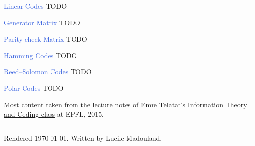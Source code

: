 \documentclass[10pt,a4paper,landscape]{article}
\newcommand{\concept}[1]{\textcolor{RoyalBlue}{#1}}
\renewcommand{\section}[1]{
    \vspace{-0.3cm}
    \begin{center}
      \color{Bittersweet}
      \hrulefill{\small~~#1~~}\hrulefill
    \end{center}
    \vspace{-0.3cm}
  }
\begin{document}
\begin{multicols*}{4}
\concept{Linear Codes} TODO
 
\concept{Generator Matrix} TODO
 
\concept{Parity-check Matrix} TODO
 
\concept{Hamming Codes} TODO

\concept{Reed–Solomon Codes} TODO

\concept{Polar Codes} TODO

\ifdefined \longversion %
\else \newpage
\fi



\section{Credits}
Most content taken from the lecture notes of Emre Telatar's \href{http://ipg.epfl.ch/doku.php?id=en:courses:2015-2016:itc}{Information Theory and Coding class} at EPFL, 2015.

\vspace{0.5cm}
\hrule
\vspace{0.5cm}
\tiny
Rendered \today. Written by Lucile Madoulaud.

\end{multicols*}
\end{document}
